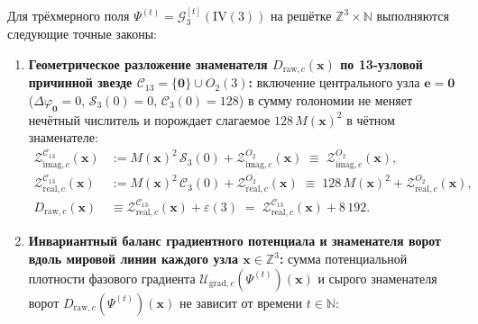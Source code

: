 \begin{theorem}[Полевой Лагранжиан $\mathcal{L}_{\mathrm{world}}$, Гамильтониан $\mathcal{H}_{\mathrm{world}}$, 13-узловая звезда $\mathcal{C}_{13} = \{\mathbf{0}\}\cup O_2(3)$, баланс потенциала и знаменателя вдоль мировой линии и тетраэдральное действие Верле]
\label{thm:mono-world-lagrangian-hamiltonian}
\leanok
Для трёхмерного поля $\Psi^{(t)} = \mathcal{G}_3^{[t]}(\mathrm{IV}(3))$ на решётке $\mathbb{Z}^3 \times \mathbb{N}$ выполняются следующие точные законы:
\begin{enumerate}[label=\textbf{(\arabic*)},leftmargin=*]
\item \textbf{Геометрическое разложение знаменателя $D_{\mathrm{raw},c}(\mathbf{x})$ по 13-узловой причинной звезде $\mathcal{C}_{13} = \{\mathbf{0}\}\cup O_2(3)$:}
  включение центрального узла $\mathbf{e} = \mathbf{0}$ ($\Delta\varphi_{\mathbf{0}} = 0$, $\mathcal{S}_3(0) = 0$, $\mathcal{C}_3(0) = 128$) в сумму голономии не меняет нечётный числитель и порождает слагаемое $128\,M(\mathbf{x})^2$ в чётном знаменателе:
  \begin{align}
    \mathcal{Z}_{\mathrm{imag},c}^{\mathcal{C}_{13}}(\mathbf{x}) &:= M(\mathbf{x})^2\,\mathcal{S}_3(0) + \mathcal{Z}_{\mathrm{imag},c}^{O_2}(\mathbf{x}) \;\equiv\; \mathcal{Z}_{\mathrm{imag},c}^{O_2}(\mathbf{x}), \label{eq:mono-c13-odd} \\
    \mathcal{Z}_{\mathrm{real},c}^{\mathcal{C}_{13}}(\mathbf{x}) &:= M(\mathbf{x})^2\,\mathcal{C}_3(0) + \mathcal{Z}_{\mathrm{real},c}^{O_2}(\mathbf{x}) \;\equiv\; 128\,M(\mathbf{x})^2 + \mathcal{Z}_{\mathrm{real},c}^{O_2}(\mathbf{x}), \label{eq:mono-c13-even} \\
    D_{\mathrm{raw},c}(\mathbf{x}) &\equiv \mathcal{Z}_{\mathrm{real},c}^{\mathcal{C}_{13}}(\mathbf{x}) + \varepsilon(3) \;=\; \mathcal{Z}_{\mathrm{real},c}^{\mathcal{C}_{13}}(\mathbf{x}) + 8\,192. \label{eq:mono-c13-denom}
  \end{align}
\item \textbf{Инвариантный баланс градиентного потенциала и знаменателя ворот вдоль мировой линии каждого узла $\mathbf{x} \in \mathbb{Z}^3$:}
  сумма потенциальной плотности фазового градиента $\mathcal{U}_{\mathrm{grad},c}(\Psi^{(t)})(\mathbf{x})$ и сырого знаменателя ворот $D_{\mathrm{raw},c}(\Psi^{(t)})(\mathbf{x})$ не зависит от времени $t \in \mathbb{N}$:
  \begin{equation}
    \label{eq:mono-worldline-denom-balance}

\end{equation}
\end{enumerate}
\end{theorem}
